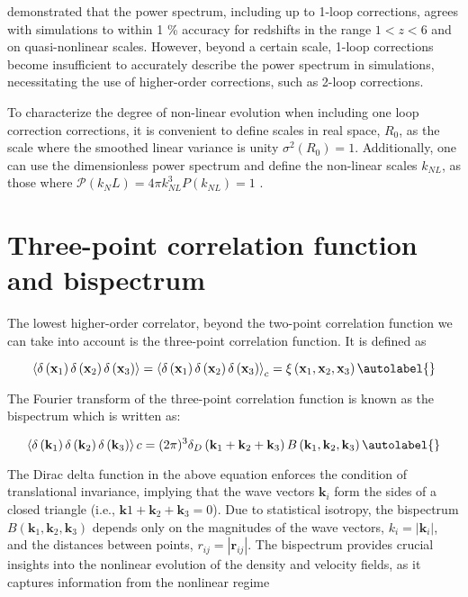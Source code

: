 \cite{Jeong_2006} demonstrated that the power spectrum, including up to 1-loop corrections, agrees with simulations to within 1 \% accuracy for redshifts in the range $1 < z < 6$ and on quasi-nonlinear scales. However, beyond a certain scale, 1-loop corrections become insufficient to accurately describe the power spectrum in simulations, necessitating the use of higher-order corrections, such as 2-loop corrections.


To characterize the degree of non-linear evolution when including one loop correction corrections, it is convenient to define scales in real space, $R_{0}$, as the scale where the smoothed linear variance is unity $\sigma^{2}\left(R_{0}\right)= 1$. Additionally, one can use the dimensionless power spectrum and define the non-linear scales $k_{N L}$, as those where $\mathcal{P} \left(k_{N} L\right)= 4 \pi k_{N L}^{3} P\left(k_{N L}\right) =1$ \cite{Bernardeau_2002}.


\section{Three-point correlation function and bispectrum}
The lowest higher-order correlator, beyond the two-point correlation function we can take into account is the three-point correlation function. It is defined as


\begin{equation}
    \left\langle\delta\left(\mathbf{x}_{1}\right) \delta\left(\mathbf{x}_{2}\right) \delta\left(\mathbf{x}_{3}\right)\right\rangle=\left\langle\delta\left(\mathbf{x}_{1}\right) \delta\left(\mathbf{x}_{2}\right) \delta\left(\mathbf{x}_{3}\right)\right\rangle_{c}=\xi\left(\mathbf{x}_{1}, \mathbf{x}_{2}, \mathbf{x}_{3}\right) \autolabel{}
\end{equation}


The Fourier transform of the three-point correlation function is known as the bispectrum which is written as:

\begin{equation}
    \left\langle \delta\left(\mathbf{k}_{1}\right) \delta\left(\mathbf{k}_{2}\right) \delta\left(\mathbf{k}_{3}\right) \right\rangle{c} = (2\pi)^{3} \delta_{D}\left(\mathbf{k}_{1} + \mathbf{k}_{2} + \mathbf{k}_{3}\right) B\left(\mathbf{k}_{1}, \mathbf{k}_{2}, \mathbf{k}_{3}\right) \autolabel{}
\end{equation}

The Dirac delta function in the above equation enforces the condition of translational invariance, implying that the wave vectors $\mathbf{k}_{i}$ form the sides of a closed triangle (i.e., $\mathbf{k}{1} + \mathbf{k}_{2} + \mathbf{k}_{3} = 0$). Due to statistical isotropy, the bispectrum $B\left(\mathbf{k}_{1}, \mathbf{k}_{2}, \mathbf{k}_{3}\right)$ depends only on the magnitudes of the wave vectors, $k_{i} = \left|\mathbf{k}_{i}\right|$, and the distances between points, $r_{ij} = \left|\mathbf{r}_{ij}\right|$. The bispectrum provides crucial insights into the nonlinear evolution of the density and velocity fields, as it captures information from the nonlinear regime


